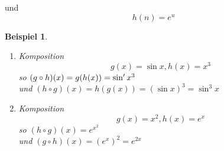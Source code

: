 \documentclass{report}
\newtheorem{myexample}{Beispiel}
\begin{document}
und
\begin{equation}
h(n) = e^u
\end{equation}
\begin{myexample}
\begin{enumerate}Anhand von Beispielen zeigen wir die Verkettung von Funktionen
\item Komposition
\begin{equation}
g(x) = \sin x, h(x) = x^3
\end{equation}
so $(g \circ h)(x) = g(h(x)) = \sin\rq{} x^3$\\
und $(h \circ g)(x) = h(g(x)) = (\sin x)^3 = \sin^3 x$

\item Komposition
\begin{equation}
g(x) = x^2, h(x) = e^x
\end{equation}
so $(h \circ g)(x) = e^{x^2}$\\
und $(g \circ h)(x) = \left(e^x\right)^2 = e^{2x}$
\end{enumerate}
\end{myexample}
\end{document}
